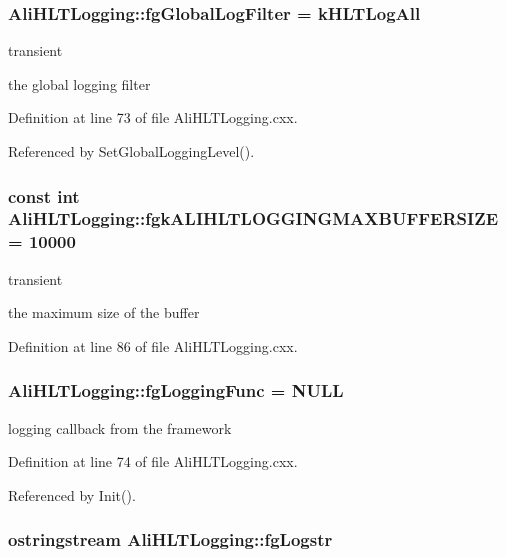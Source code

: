 \subsubsection{ {\bf Ali\-HLTLogging::fg\-Global\-Log\-Filter} = k\-HLTLog\-All\hspace{0.3cm}{\tt  [static, private]}}\label{classAliHLTLogging_v0}


transient 

the global logging filter 

Definition at line 73 of file Ali\-HLTLogging.cxx.

Referenced by Set\-Global\-Logging\-Level().
\subsubsection{\setlength{\rightskip}{0pt plus 5cm}const int {\bf Ali\-HLTLogging::fgk\-ALIHLTLOGGINGMAXBUFFERSIZE} = 10000\hspace{0.3cm}{\tt  [static, private]}}\label{classAliHLTLogging_v4}


transient 

the maximum size of the buffer 

Definition at line 86 of file Ali\-HLTLogging.cxx.
\subsubsection{ {\bf Ali\-HLTLogging::fg\-Logging\-Func} = NULL\hspace{0.3cm}{\tt  [static, private]}}\label{classAliHLTLogging_v1}


logging callback from the framework 

Definition at line 74 of file Ali\-HLTLogging.cxx.

Referenced by Init().
\subsubsection{\setlength{\rightskip}{0pt plus 5cm}ostringstream {\bf Ali\-HLTLogging::fg\-Logstr}\hspace{0.3cm}{\tt  [static]}}\label{classAliHLTLogging_s0}


